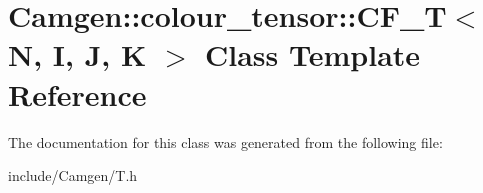 \hypertarget{a00034}{}\section{Camgen\+:\+:colour\+\_\+tensor\+:\+:C\+F\+\_\+\+T$<$ N, I, J, K $>$ Class Template Reference}
\label{a00034}


The documentation for this class was generated from the following file\+:\begin{DoxyCompactItemize}
\item 
include/\+Camgen/T.\+h\end{DoxyCompactItemize}
